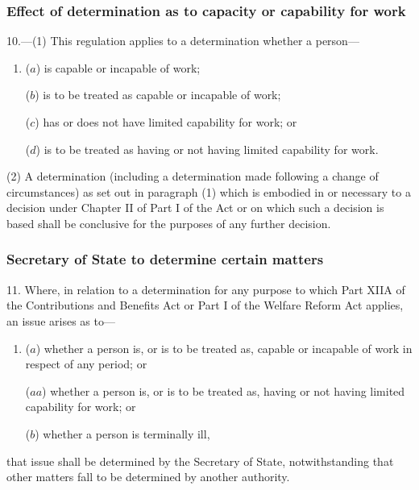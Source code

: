 \documentclass[12pt,a4paper]{article}
\begin{document}
\subsubsection[10. Effect of determination as to capacity or capability for work]{Effect of determination as to capacity or capability for work}

10.---(1)  This regulation applies to a determination whether a person—
\begin{enumerate}\item[]
($a$) is capable or incapable of work;

($b$) is to be treated as capable or incapable of work;

($c$) has or does not have limited capability for work; or

($d$) is to be treated as having or not having limited capability for work.
\end{enumerate}

(2) A determination (including a determination made following a change of circumstances) as set out in paragraph (1) which is embodied in or necessary to a decision under Chapter II of Part I of the Act or on which such a decision is based shall be conclusive for the purposes of any further decision.


\subsubsection[11. Secretary of State to determine certain matters]{Secretary of State to determine certain matters}

11.  Where, in relation to a determination for any purpose to which Part XIIA of the Contributions and Benefits Act 
or Part I of the Welfare Reform Act  %
applies, an issue arises as to—
\begin{enumerate}\item[]
($a$) whether a person is, or is to be treated as, capable or incapable of work in respect of any period; or

($aa$) whether a person is, or is to be treated as, having or not having limited capability for work; or

($b$) whether a person is terminally ill,
\end{enumerate}
that issue shall be determined by the Secretary of State, notwithstanding that other matters fall to be determined by another authority.
\end{document}

